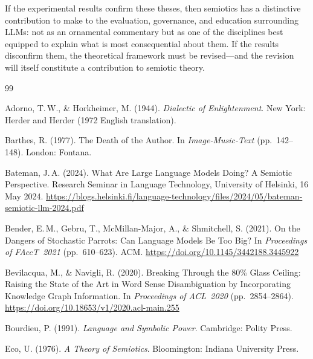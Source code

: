\documentclass[12pt,a4paper]{article}
\begin{document}
If the experimental results confirm these theses, then semiotics has a
distinctive contribution to make to the evaluation, governance, and education
surrounding LLMs: not as an ornamental commentary but as one of the disciplines
best equipped to explain what is most consequential about them. If the results
disconfirm them, the theoretical framework must be revised---and the revision
will itself constitute a contribution to semiotic theory.



\bigskip
\begin{thebibliography}{99}

Adorno, T.\,W., \& Horkheimer, M. (1944).
\newblock \emph{Dialectic of Enlightenment}.
\newblock New York: Herder and Herder (1972 English translation).

Barthes, R. (1977).
\newblock The Death of the Author.
\newblock In \emph{Image-Music-Text} (pp.~142--148). London: Fontana.

Bateman, J.\,A. (2024).
\newblock What Are Large Language Models Doing? A Semiotic Perspective.
\newblock Research Seminar in Language Technology, University of Helsinki,
16 May 2024.
\newblock \url{https://blogs.helsinki.fi/language-technology/files/2024/05/bateman-semiotic-llm-2024.pdf}

Bender, E.\,M., Gebru, T., McMillan-Major, A., \& Shmitchell, S. (2021).
\newblock On the Dangers of Stochastic Parrots: Can Language Models Be Too Big?
\newblock In \emph{Proceedings of FAccT~2021} (pp.~610--623). ACM.
\newblock \url{https://doi.org/10.1145/3442188.3445922}

Bevilacqua, M., \& Navigli, R. (2020).
\newblock Breaking Through the 80\% Glass Ceiling: Raising the State of the
Art in Word Sense Disambiguation by Incorporating Knowledge Graph Information.
\newblock In \emph{Proceedings of ACL~2020} (pp.~2854--2864).
\newblock \url{https://doi.org/10.18653/v1/2020.acl-main.255}

Bourdieu, P. (1991).
\newblock \emph{Language and Symbolic Power}.
\newblock Cambridge: Polity Press.

Eco, U. (1976).
\newblock \emph{A Theory of Semiotics}.
\newblock Bloomington: Indiana University Press.


\end{thebibliography}
\end{document}
